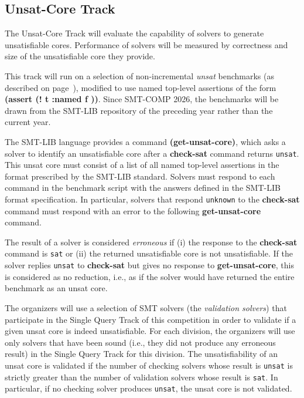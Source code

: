 \documentclass[12pt]{article}
\newcommand{\akey}[1]{\textbf{#1}\xspace}
\newcommand{\maintrack}{Single Query Track\xspace}
\newcommand{\inctrack}{Incremental Track\xspace}
\newcommand{\ucoretrack}{Unsat-Core Track\xspace}
\begin{document}

\subsection{\ucoretrack}
\label{sec:exec:unsat-core}

The \ucoretrack will evaluate the capability of solvers to generate
unsatisfiable cores.  Performance of solvers will be measured by correctness
and size of the unsatisfiable core they provide.

This track will run on a selection of non-incremental \emph{unsat} benchmarks
(as described on page~\pageref{benchmark-selection}), modified
to use named top-level assertions of the form \akey{(assert (! t :named f ))}.
Since SMT-COMP 2026, the benchmarks will be drawn from the SMT-LIB repository of
the preceding year rather than the current year.

The SMT-LIB language provides a command \akey{(get-unsat-core)}, which asks
a solver to identify an unsatisfiable core after a \akey{check-sat}
command returns \texttt{unsat}.
This unsat core must consist of a list of all named top-level
assertions in the format prescribed by the SMT-LIB standard.
%
Solvers must respond to each command in the benchmark script with the
answers defined in the SMT-LIB format specification.  In particular,
solvers that respond \texttt{unknown} to the \akey{check-sat} command
must respond with an error to the following \akey{get-unsat-core}
command.

The result of a solver is considered \emph{erroneous} if (i) the
response to the \akey{check-sat} command is \texttt{sat} or (ii) the
returned unsatisfiable core is not unsatisfiable.
%
If the solver replies \texttt{unsat} to \akey{check-sat} but gives no
response to \akey{get-unsat-core}, this is considered as no reduction, i.e.,
as if the solver would have returned the entire benchmark as an unsat
core.

The organizers will use a selection of SMT solvers (the \emph{validation
solvers}) that participate in the \maintrack of this competition in order to
validate if a given unsat core is indeed unsatisfiable.  For each division, the
organizers will use only solvers that have been sound (i.e., they did not
produce any erroneous result) in the \maintrack for this division.  The
unsatisfiability of an unsat core is validated if the number of checking solvers
whose result is \texttt{unsat} is strictly greater than the number of validation
solvers whose result is \texttt{sat}. In particular, if no checking solver
produces \texttt{unsat}, the unsat core is not validated.
\end{document}
